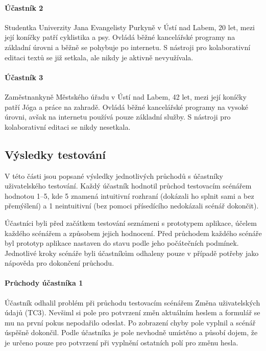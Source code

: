 \paragraph{Účastník 2}
Studentka Univerzity Jana Evangelisty Purkyně v Ústí nad Labem, 20 let, mezi její koníčky patří cyklistika a psy.
Ovládá běžné kancelářské programy na základní úrovni a běžně se pohybuje po internetu.
S nástroji pro kolaborativní editaci textů se již setkala, ale nikdy je aktivně nevyužívala.

\paragraph{Účastník 3}
Zaměstnankyně Městského úřadu v Ústí nad Labem, 42 let, mezi její koníčky patří Jóga a práce na zahradě.
Ovládá běžné kancelářské programy na vysoké úrovni, avšak na internetu používá pouze základní služby.
S nástroji pro kolaborativní editaci se nikdy nesetkala.

\subsection{Výsledky testování}\label{subsec:výsledkyTestování}

V této části jsou popsané výsledky jednotlivých průchodů s účastníky uživatelského testování.
Každý účastník hodnotil průchod testovacím scénářem hodnotou 1--5, kde 5 znamená intuitivní rozhraní (dokázali ho splnit sami a bez přemýšlení) a 1 neintuitivní (bez pomoci přísedícího nedokázali scénář dokončit).

Účastníci byli před začátkem testování seznámeni s prototypem aplikace, účelem každého scénářem a způsobem jejich hodnocení.
Před průchodem každého scénáře byl prototyp aplikace nastaven do stavu podle jeho počátečních podmínek.
Jednotlivé kroky scénáře byli účastníkům odhaleny pouze v případě potřeby jako nápověda pro dokončení průchodu.

\paragraph{Průchody účastníka 1}

Účastník odhalil problém při průchodu testovacím scénářem Změna uživatelských údajů (TC3).
Nevšiml si pole pro potvrzení změn aktuálním heslem a formulář se mu na první pokus nepodařilo odeslat.
Po zobrazení chyby pole vyplnil a scénář úspěšně dokončil.
Podle účastníka je pole nevhodně umístěno a působí dojem, že je určeno pouze pro potvrzení při vyplnění ostatních polí pro změnu hesla.


